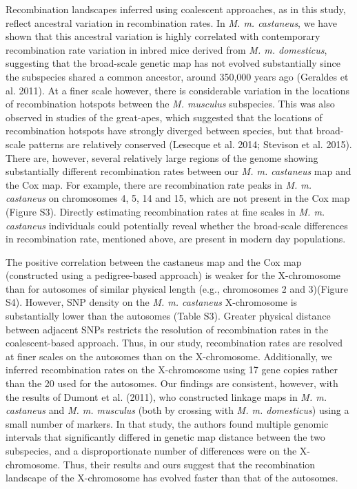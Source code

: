 	Recombination landscapes inferred using coalescent approaches, as in this study, reflect ancestral variation in recombination rates. In \textit{M. m. castaneus}, we have shown that this ancestral variation is highly correlated with contemporary recombination rate variation in inbred mice derived from \textit{M. m. domesticus}, suggesting that the broad-scale genetic map has not evolved substantially since the subspecies shared a common ancestor, around 350,000 years ago (Geraldes et al. 2011). At a finer scale however, there is considerable variation in the locations of recombination hotspots between the \textit{M. musculus} subspecies. This was also observed in studies of the great-apes, which suggested that the locations of recombination hotspots have strongly diverged between species, but that broad-scale patterns are relatively conserved (Lesecque et al. 2014; Stevison et al. 2015). There are, however, several relatively large regions of the genome showing substantially different recombination rates between our \textit{M. m. castaneus} map and the Cox map. For example, there are recombination rate peaks in \textit{M. m. castaneus} on chromosomes 4, 5, 14 and 15, which are not present in the Cox map (Figure S3). Directly estimating recombination rates at fine scales in \textit{M. m. castaneus} individuals could potentially reveal whether the broad-scale differences in recombination rate, mentioned above, are present in modern day populations. 

The positive correlation between the castaneus map and the Cox map (constructed using a pedigree-based approach) is weaker for the X-chromosome than for autosomes of similar physical length (e.g., chromosomes 2 and 3)(Figure S4). However, SNP density on the \textit{M. m. castaneus} X-chromosome is substantially lower than the autosomes (Table S3). Greater physical distance between adjacent SNPs restricts the resolution of recombination rates in the coalescent-based approach. Thus, in our study, recombination rates are resolved at finer scales on the autosomes than on the X-chromosome. Additionally, we inferred recombination rates on the X-chromosome using 17 gene copies rather than the 20 used for the autosomes. Our findings are consistent, however, with the results of Dumont et al. (2011), who constructed linkage maps in \textit{M. m. castaneus} and \textit{M. m. musculus} (both by crossing with \textit{M. m. domesticus}) using a small number of markers. In that study, the authors found multiple genomic intervals that significantly differed in genetic map distance between the two subspecies, and a disproportionate number of differences were on the X-chromosome. Thus, their results and ours suggest that the recombination landscape of the X-chromosome has evolved faster than that of the autosomes. 


